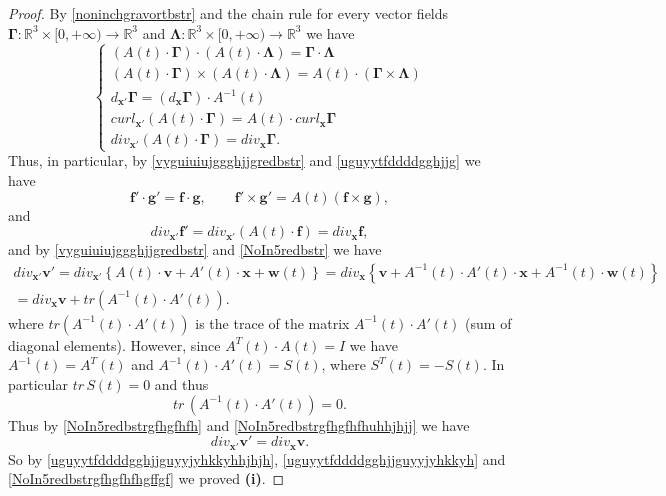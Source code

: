 \documentclass{article}
\theoremstyle{definition}
\theoremstyle{remark}
\renewcommand{\vec}[1]{\mathbf{#1}}
\newcommand{\R}{\mathbb{R}}
\newcommand{\er}{\eqref}
\newcommand{\R}{{\mathbb{R}}}
\newcommand{\er}{\eqref}
\begin{document}
\begin{proof}
By \er{noninchgravortbstr} and the chain rule for every vector
fields $\vec \Gamma:\R^3\times[0,+\infty)\to\R^3$ and $\vec
\Lambda:\R^3\times[0,+\infty)\to\R^3$ we have
\begin{equation}
\label{vyguiuiujggghjjgredbstr}
\begin{cases}
\left(A(t)\cdot\vec \Gamma\right)\cdot\left(A(t)\cdot\vec
\Lambda\right)=\vec\Gamma\cdot\vec \Lambda\\
\left(A(t)\cdot\vec \Gamma\right)\times\left(A(t)\cdot\vec
\Lambda\right)=A(t)\cdot\left(\vec\Gamma\times\vec \Lambda\right)
\\
d_{\vec x'}\vec \Gamma=\left(d_{\vec x}\vec \Gamma\right)\cdot A^{-1}(t)\\
curl_{\vec x'}\left( A(t)\cdot\vec \Gamma\right)=A(t)\cdot
curl_{\vec x}
\vec \Gamma\\
div_{\vec x'}\left( A(t)\cdot\vec \Gamma\right)=div_{\vec x}\vec
\Gamma.
\end{cases}
\end{equation}
Thus, in particular, by \er{vyguiuiujggghjjgredbstr} and
\er{uguyytfddddgghjjg} we have
\begin{equation}\label{uguyytfddddgghjjguyyjyhkkyhhjhjh}
\vec f'\cdot\vec g'=\vec f\cdot\vec g,\quad\quad \vec f'\times\vec
g'=A(t)\left(\vec f\times\vec g\right),
\end{equation}
and
\begin{equation}\label{uguyytfddddgghjjguyyjyhkkyh}
div_{\vec x'}\vec f'=div_{\vec x'}\left(A(t)\cdot\vec
f\right)=div_{\vec x}\vec f,
\end{equation}
and by \er{vyguiuiujggghjjgredbstr} and \er{NoIn5redbstr} we have
\begin{multline}
\label{NoIn5redbstrgfhgfhfh} div_{\vec x'}\vec v'=div_{\vec
x'}\left\{A(t)\cdot \vec v+
A'(t)\cdot\vec x+\vec w(t)\right\}=div_{\vec x}\left\{\vec
v+A^{-1}(t)\cdot A'(t)\cdot\vec x+A^{-1}(t)\cdot\vec
w(t)\right\}\\=div_{\vec x}\vec v+tr\left(A^{-1}(t)\cdot
A'(t)\right).
\end{multline}
where $tr\left(A^{-1}(t)\cdot A'(t)\right)$ is the trace of the
matrix $A^{-1}(t)\cdot A'(t)$ (sum of diagonal elements). However,
since $A^T(t)\cdot A(t)=I$ we have $A^{-1}(t)=A^T(t)$ and
$A^{-1}(t)\cdot A'(t)=S(t)$, where $S^T(t)=-S(t)$. In particular
$tr\, S(t)=0$ and thus
\begin{equation}
\label{NoIn5redbstrgfhgfhfhuhhjhjj} tr\,\left(A^{-1}(t)\cdot
A'(t)\right)=0.
\end{equation}
Thus by \er{NoIn5redbstrgfhgfhfh} and
\er{NoIn5redbstrgfhgfhfhuhhjhjj} we have
\begin{equation}
\label{NoIn5redbstrgfhgfhfhgffgf} div_{\vec x'}\vec v'=div_{\vec
x}\vec v.
\end{equation}
So by \er{uguyytfddddgghjjguyyjyhkkyhhjhjh},
\er{uguyytfddddgghjjguyyjyhkkyh} and \er{NoIn5redbstrgfhgfhfhgffgf}
we proved {\bf(i)}.



\end{proof}
\end{document}
